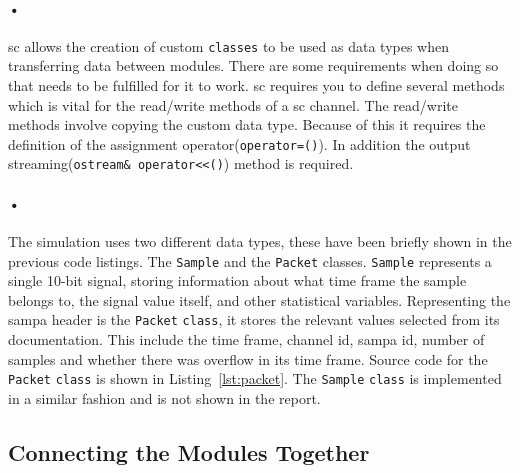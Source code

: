 \documentclass[a4paper, 12pt]{report}
\newcommand{\codeword}[1]{\texttt{#1}}
\begin{document}
\paragraph{•}
\gls{sc} allows the creation of custom \codeword{classes} to be used as data types when transferring data between modules.
There are some requirements when doing so that needs to be fulfilled for it to work.
\gls{sc} requires you to define several methods which is vital for the read/write methods of a \gls{sc} channel.
The read/write methods involve copying the custom data type.
Because of this it requires the definition of the assignment operator(\codeword{operator=()}).
In addition the output streaming(\codeword{ostream\& operator<<()}) method is required. 

\paragraph{•}
The simulation uses two different data types, these have been briefly shown in the previous code listings.
The \codeword{Sample} and the \codeword{Packet} classes.
\codeword{Sample} represents a single 10-bit signal, storing information about what time frame the sample belongs to, the signal value itself, and other statistical variables.
Representing the \gls{sampa} header is the \codeword{Packet} \codeword{class}, it stores the relevant values selected from its documentation.
This include the time frame, channel id, sampa id, number of samples and whether there was overflow in its time frame.
Source code for the \codeword{Packet} \codeword{class} is shown in Listing~\ref{lst:packet}.
The \codeword{Sample} \codeword{class} is implemented in a similar fashion and is not shown in the report. 

\begin{minipage}{\linewidth}

\end{minipage}

\subsection{Connecting the Modules Together}
\end{document}
